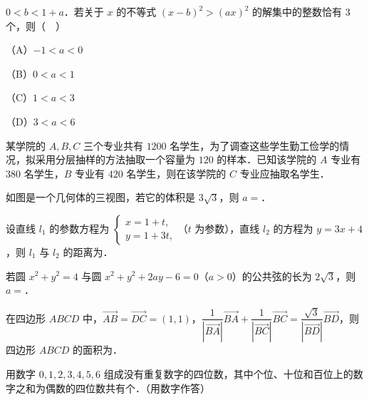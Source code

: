 \begin{question}
$0<b<1+a$．若关于 $x$ 的不等式 $(x-b)^2>(ax)^2$ 的解集中的整数恰有 $3$ 个，则（　）

（A）$-1<a<0$

（B）$0<a<1$

（C）$1<a<3$

（D）$3<a<6$

\end{question}

\begin{question}
某学院的 $A,B,C$ 三个专业共有 $1200$ 名学生，为了调查这些学生勤工俭学的情况，拟采用分层抽样的方法抽取一个容量为 $120$ 的样本．已知该学院的 $A$ 专业有 $380$ 名学生，$B$ 专业有 $420$ 名学生，则在该学院的 $C$ 专业应抽取\gkblank{}名学生．

\Needspace{0.4\textheight}
\end{question}
\begin{question}
如图是一个几何体的三视图，若它的体积是 $3\sqrt3$，则 $a=$\gkblank{}．
\nopagebreak[4]
\begin{center}\end{center}
\nopagebreak[4]
\end{question}
\begin{question}
设直线 $l_1$ 的参数方程为 $\begin{cases}x=1+t,\\ y=1+3t,\end{cases}$（$t$ 为参数），直线 $l_2$ 的方程为 $y=3x+4$，则 $l_1$ 与 $l_2$ 的距离为\gkblank{}．

\end{question}
\begin{question}
若圆 $x^2+y^2=4$ 与圆 $x^2+y^2+2ay-6=0$（$a>0$）的公共弦的长为 $2\sqrt3$，则 $a=$\gkblank{}．

\end{question}
\begin{question}
在四边形 $ABCD$ 中，$\overrightarrow{AB}=\overrightarrow{DC}=(1,1)$，$\dfrac{1}{|\overrightarrow{BA}|}\overrightarrow{BA}+\dfrac{1}{|\overrightarrow{BC}|}\overrightarrow{BC}=\dfrac{\sqrt3}{|\overrightarrow{BD}|}\overrightarrow{BD}$，则四边形 $ABCD$ 的面积为\gkblank{}．

\end{question}
\begin{question}
用数字 $0,1,2,3,4,5,6$ 组成没有重复数字的四位数，其中个位、十位和百位上的数字之和为偶数的四位数共有\gkblank{}个．（用数字作答）

\end{question}

